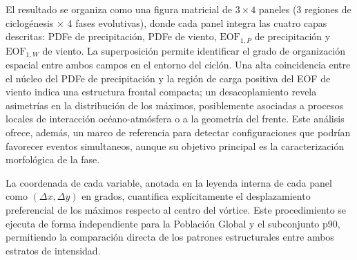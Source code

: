 El resultado se organiza como una figura matricial de $3 \times 4$ paneles (3 regiones de ciclogénesis $\times$ 4 fases evolutivas), donde cada panel integra las cuatro capas descritas: PDFe de precipitación, PDFe de viento, $\text{EOF}_{1,P}$ de precipitación y $\text{EOF}_{1,W}$ de viento. 
La superposición permite identificar el grado de organización espacial entre ambos campos en el entorno del ciclón. 
Una alta coincidencia entre el núcleo del PDFe de precipitación y la región de carga positiva del EOF de viento indica una estructura frontal compacta; un desacoplamiento revela asimetrías en la distribución de los máximos, posiblemente asociadas a procesos locales de interacción océano-atmósfera o a la geometría del frente. 
Este análisis ofrece, además, un marco de referencia para detectar configuraciones que podrían favorecer eventos simultaneos, aunque su objetivo principal es la caracterización morfológica de la fase.

La coordenada de cada variable, anotada en la leyenda interna de cada panel como $(\Delta x, \Delta y)$ en grados, cuantifica explícitamente el desplazamiento preferencial de los máximos respecto al centro del vórtice. Este procedimiento se ejecuta de forma independiente para la Población Global y el subconjunto p90, permitiendo la comparación directa de los patrones estructurales entre ambos estratos de intensidad.